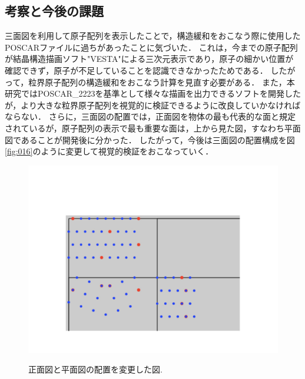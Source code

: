 \subsection{考察と今後の課題}
三面図を利用して原子配列を表示したことで，構造緩和をおこなう際に使用したPOSCARファイルに過ちがあったことに気づいた．
これは，今までの原子配列が結晶構造描画ソフト"VESTA"による三次元表示であり，原子の細かい位置が確認できず，原子が不足していることを認識できなかったためである．
したがって，粒界原子配列の構造緩和をおこなう計算を見直す必要がある．
また，本研究ではPOSCAR\_2223を基準として様々な描画を出力できるソフトを開発したが，より大きな粒界原子配列を視覚的に検証できるように改良していかなければならない．
さらに，三面図の配置では，正面図を物体の最も代表的な面と規定されているが，原子配列の表示で最も重要な面は，上から見た図，すなわち平面図であることが開発後に分かった．
したがって，今後は三面図の配置構成を図\ref{fig:016}のように変更して視覚的検証をおこなっていく．

\begin{figure}[htbp]\begin{center}
\includegraphics[width=12cm,bb= 0 0 937 753]{../figs/./boundary_narita.016.jpeg}
\caption{正面図と平面図の配置を変更した図.}
\label{fig:016}
\label{default}\end{center}\end{figure}
